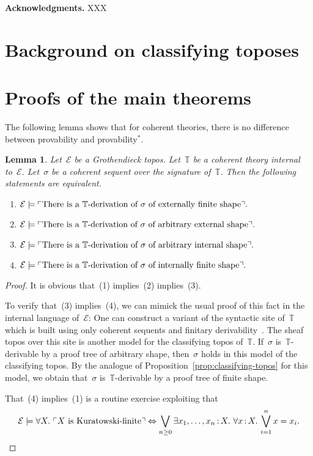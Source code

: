 \documentclass[oneside,reqno]{amsart}
\theoremstyle{definition}
\theoremstyle{plain}
\newtheorem{lemma}[defn]{Lemma}
\theoremstyle{remark}
\newcommand{\E}{\mathcal{E}}
\newcommand{\TT}{\mathbb{T}}
\renewcommand{\_}{\mathpunct{.}\,}
\newcommand{\?}{\,{:}\,}
\newcommand{\speak}[1]{\ulcorner\text{\textnormal{#1}}\urcorner}
\renewcommand{\paragraph}[1]{\noindent\textbf{#1.}}
\begin{document}
\paragraph{Acknowledgments} XXX


\section{Background on classifying toposes}

\section{Proofs of the main theorems}

The following lemma shows that for coherent theories, there is no difference
between provability and provability$^*$.

\begin{lemma}Let~$\E$ be a Grothendieck topos. Let~$\TT$ be a coherent theory
internal to~$\E$. Let~$\sigma$ be a coherent sequent over the signature
of~$\TT$. Then the following statements are equivalent.
\begin{enumerate}
\item $\E \models \speak{There is a~$\TT$-derivation of~$\sigma$ of externally
finite shape}.$
\item $\E \models \speak{There is a~$\TT$-derivation of~$\sigma$ of arbitrary
external shape}.$
\item $\E \models \speak{There is a~$\TT$-derivation of~$\sigma$ of arbitrary
internal shape}.$
\item $\E \models \speak{There is a~$\TT$-derivation of~$\sigma$ of internally
finite shape}.$
\end{enumerate}
\end{lemma}

\begin{proof}It is obvious that~(1) implies~(2) implies~(3).

To verify that~(3) implies~(4), we can mimick the usual proof of this fact in
the internal language of~$\E$: One can construct a variant of the syntactic
site of~$\TT$ which is built using only coherent sequents and finitary
derivability~\cite[Section~1.4]{caramello:tst}. The sheaf topos over this site
is another model for the classifying topos of~$\TT$. If~$\sigma$
is~$\TT$-derivable by a proof tree of arbitrary shape, then~$\sigma$ holds in
this model of the classifying topos. By the analogue of
Proposition~\ref{prop:classifying-topos} for this model, we obtain
that~$\sigma$ is~$\TT$-derivable by a proof tree of finite shape.

That~(4) implies~(1) is a routine exercise exploiting that
\[ \E \models \forall X\_ \speak{$X$ is Kuratowski-finite} \Leftrightarrow
  \bigvee_{n \geq 0} \exists x_1,\ldots,x_n \? X\_
  \forall x \? X\_ \bigvee_{i=1}^n x = x_i. \]
\end{proof}
\end{document}
